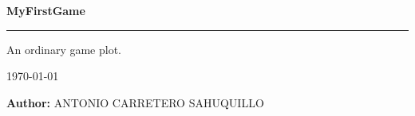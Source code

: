 \begin{titlepage}

    \vspace*{4cm}
    \centering
    
    {
        \Huge \textbf{MyFirstGame} 
        \vspace{2mm}
        \hrule
        \vspace{3mm}
        \LARGE An ordinary game plot.
    }

    \vspace{2cm}

    {
        \today
    }

    \vfill

    \begin{flushright}
        \textbf{Author:} \newline ANTONIO CARRETERO SAHUQUILLO
    \end{flushright}


\end{titlepage}